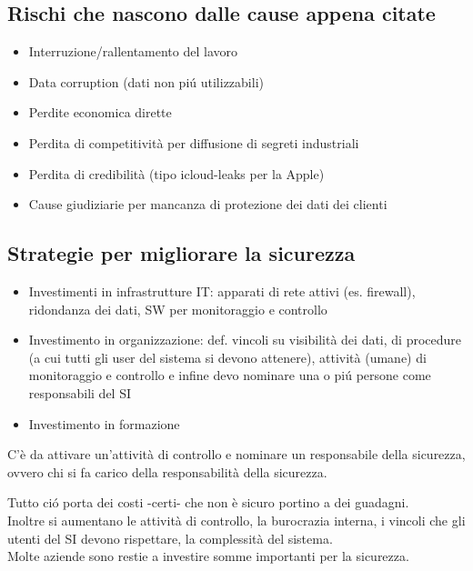 \subsection{Rischi che nascono dalle cause appena citate}

\begin{itemize}

\item
  Interruzione/rallentamento del lavoro
\item
  Data corruption (dati non pi\'u utilizzabili)
\item
  Perdite economica dirette
\item
  Perdita di competitivit\`a per diffusione di segreti industriali
\item
  Perdita di credibilit\`a (tipo icloud-leaks per la Apple)
\item
  Cause giudiziarie per mancanza di protezione dei dati dei clienti
\end{itemize}

\subsection{Strategie per migliorare la
sicurezza}

\begin{itemize}

\item
  Investimenti in infrastrutture IT: apparati di rete attivi (es.
  firewall), ridondanza dei dati, SW per monitoraggio e controllo
\item
  Investimento in organizzazione: def. vincoli su visibilit\`a dei dati,
  di procedure (a cui tutti gli user del sistema si devono attenere),
  attivit\`a (umane) di monitoraggio e controllo e infine devo nominare
  una o pi\'u persone come responsabili del SI
\item
  Investimento in formazione
\end{itemize}

C'\`e da attivare un'attivit\`a di controllo e nominare un responsabile della 
sicurezza, ovvero chi si fa carico della responsabilit\`a della sicurezza.

Tutto ci\'o porta dei costi -certi- che non \`e sicuro portino a dei
guadagni.\\
Inoltre si aumentano le attivit\`a di controllo, la burocrazia interna, i
vincoli che gli utenti del SI devono rispettare, la complessit\`a del
sistema.\\
Molte aziende sono restie a investire somme importanti per la
sicurezza.

